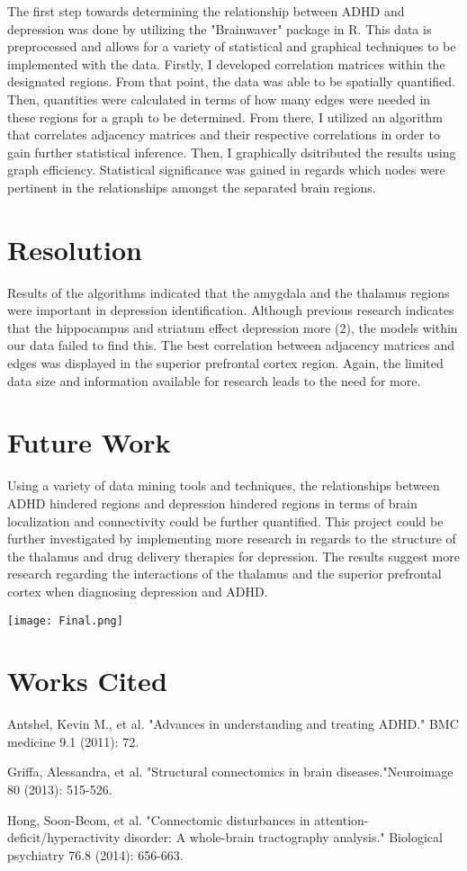 \documentclass{article}
\begin{document}
The first step towards determining the relationship between ADHD and depression was done by utilizing the "Brainwaver" package in R. This data is preprocessed and allows for a variety of statistical and graphical techniques to be implemented with the data. Firstly, I developed correlation matrices within the designated regions. From that point, the data was able to be spatially quantified. Then, quantities were calculated in terms of how many edges were needed in these regions for a graph to be determined. From there, I utilized an algorithm that correlates adjacency matrices and their respective correlations in order to gain further statistical inference. Then, I graphically dsitributed the results using graph efficiency. Statistical significance was gained in regards which nodes were pertinent in the relationships amongst the separated brain regions. 


\section{Resolution}

Results of the algorithms indicated that the amygdala and the thalamus regions were important in depression identification. Although previous research indicates that the hippocampus and striatum effect depression more (2), the models within our data failed to find this. The best correlation between adjacency matrices and edges was displayed in the superior prefrontal cortex region. Again, the limited data size and information available for research leads to the need for more. 

\section{Future Work}

Using a variety of data mining tools and techniques, the relationships between ADHD hindered regions and depression hindered regions in terms of brain localization and connectivity could be further quantified. This project could be further investigated by implementing more research in regards to the structure of the thalamus and drug delivery therapies for depression. The results suggest more research regarding the interactions of the thalamus and the superior prefrontal cortex when diagnosing depression and ADHD. 


\texttt{[image: Final.png]}


\section{Works Cited}
Antshel, Kevin M., et al. "Advances in understanding and treating ADHD." BMC medicine 9.1 (2011): 72.

Griffa, Alessandra, et al. "Structural connectomics in brain diseases."Neuroimage 80 (2013): 515-526.

Hong, Soon-Beom, et al. "Connectomic disturbances in attention-deficit/hyperactivity disorder: A whole-brain tractography analysis." Biological psychiatry 76.8 (2014): 656-663.
\end{document}
